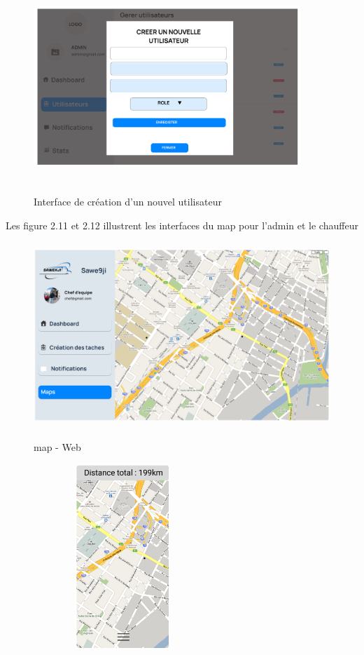 \newpage

\begin{figure}[h!]
  \centering
  \includegraphics[width=0.9\textwidth, height=8cm]{chap2.images/PROT ADD USER.png}
  \caption{Interface de création d'un nouvel utilisateur}
\end{figure}

\vspace{1cm}
Les figure 2.11 et 2.12 illustrent les interfaces du map pour l'admin et le chauffeur

\begin{figure}[h!]
  \centering
  \begin{minipage}[t]{0.60\textwidth}
    \centering
    \includegraphics[width=1.1\textwidth, height=7cm]{chap2.images/maps web.png}
    \caption{map - Web}
  \end{minipage}
  \hfill
  \begin{minipage}[t]{0.38\textwidth}
    \centering
    \includegraphics[width=0.6\textwidth, height=7cm]{chap2.images/map mobile.png}
    \caption{}
  \end{minipage}
\end{figure}


